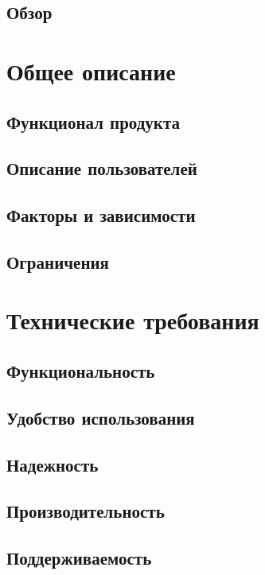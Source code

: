\documentclass{article}
\begin{document}
  \subsection{Обзор}
  

\section{Общее описание}

  \subsection{Функционал продукта}
  

  \subsection{Описание пользователей}
  

  \subsection{Факторы и зависимости}
  

  \subsection{Ограничения}
  

\section{Технические требования}

  \subsection{Функциональность}
  

  \subsection{Удобство использования}
  

  \subsection{Надежность}
  

  \subsection{Производительность}
  

  \subsection{Поддерживаемость}
  
\end{document}
